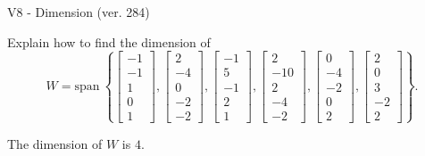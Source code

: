 \begin{exercise}
  \begin{exerciseTitle}V8 - Dimension (ver. 284)\end{exerciseTitle}
  \begin{exerciseStatement}
    Explain how to find the dimension of 
\[W=\mathrm{span}\ \left\{\left[\begin{array}{r}
-1 \\
-1 \\
1 \\
0 \\
1
\end{array}\right] , \left[\begin{array}{r}
2 \\
-4 \\
0 \\
-2 \\
-2
\end{array}\right] , \left[\begin{array}{r}
-1 \\
5 \\
-1 \\
2 \\
1
\end{array}\right] , \left[\begin{array}{r}
2 \\
-10 \\
2 \\
-4 \\
-2
\end{array}\right] , \left[\begin{array}{r}
0 \\
-4 \\
-2 \\
0 \\
2
\end{array}\right] , \left[\begin{array}{r}
2 \\
0 \\
3 \\
-2 \\
2
\end{array}\right]\right\}.\]



  \end{exerciseStatement}
  \begin{exerciseAnswer}
   The dimension of \(W\) is  \(4\).
  


  \end{exerciseAnswer}
\end{exercise}